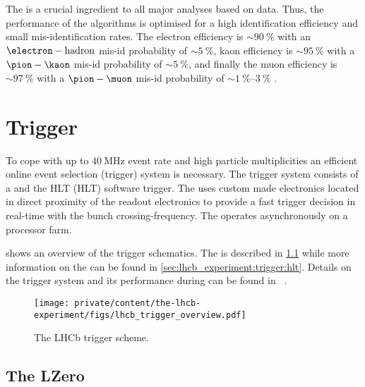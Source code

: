 The \PID is a crucial ingredient to all major analyses based on \LHCb data.
Thus, the performance of the \PID algorithms is optimised for a high
identification efficiency and small mis-identification rates. The electron \PID
efficiency is $\sim\SI{90}{\percent}$ with an $\electron-\text{hadron}$ mis-id
probability of $\sim\SI{5}{\percent}$, kaon \PID efficiency is
$\sim\SI{95}{\percent}$ with a $\pion-\kaon$ mis-id probability of
$\sim\SI{5}{\percent}$, and finally the muon \PID efficiency is
$\sim\SI{97}{\percent}$ with a $\pion-\muon$ mis-id probability of
$\sim\SIrange[range-phrase = -,range-units = single]{1}{3}{\percent}$
\cite{Aaij:2014jba,Archilli:2013npa}.

\section{Trigger}
\label{sec:lhcb_experiment:trigger}

To cope with up to $\SI{40}{\mega\hertz}$ event rate and high particle
multiplicities an efficient online event selection (trigger) system is
necessary. The \LHCb trigger system consists of a \LZero and the \acs{HLT}
(\acl{HLT}) software trigger. The \LZero uses custom made electronics located in
direct proximity of the readout electronics to provide a fast trigger decision
in real-time with the bunch crossing-frequency. The \HLT operates asynchronously
on a processor farm.

 shows an overview of the \LHCb
trigger schematics. The \LZero is described in
\cref{sec:lhcb_experiment:trigger:lzero} while more information on the \HLT can
be found in \cref{sec:lhcb_experiment:trigger:hlt}. Details on the \LHCb trigger
system and its performance during \RunOne can be found in
\Refs~\cite{Aaij:2012me,Albrecht:2013fba}.
%
\begin{figure}[t]
  \centering
  \texttt{[image: private/content/the-lhcb-experiment/figs/lhcb\_trigger\_overview.pdf]}
  \caption{
    The \acs{LHCb} \RunOne trigger scheme. \cite{lhcb:trigger}
  }
  \label{fig:lhcb_experiment:trigger:overview}
\end{figure}

\subsection{The \acl*{LZero}}
\label{sec:lhcb_experiment:trigger:lzero}

